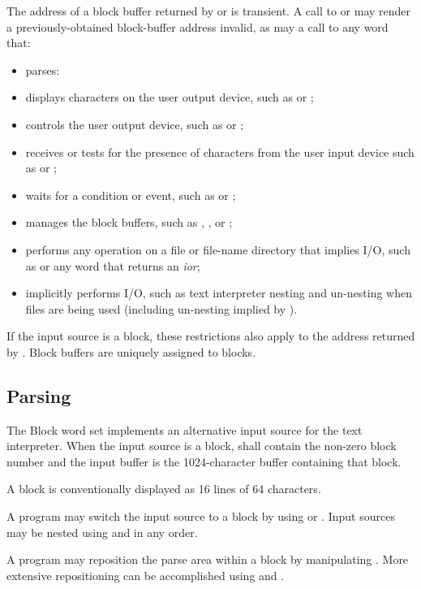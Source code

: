 The address of a block buffer returned by  or
 is transient. A call to  or 
may render a previously-obtained block-buffer address invalid, as
may a call to any word that:
\begin{itemize}
\item parses:
\item displays characters on the user output device, such as
	 or ;
\item controls the user output device, such as  or
	;
\item receives or tests for the presence of characters from the
	user input device such as  or
	;
\item waits for a condition or event, such as 
	or ;
\item manages the block buffers, such as ,
	, or ;
\item performs any operation on a file or file-name directory
	that implies I/O, such as  or any word that
	returns an \emph{ior};
\item implicitly performs I/O, such as text interpreter nesting
	and un-nesting when files are being used (including un-nesting
	implied by ).
\end{itemize}

If the input source is a block, these restrictions also apply to
the address returned by . Block buffers are
uniquely assigned to blocks.

\subsection{Parsing} %

The Block word set implements an alternative input source for the
text interpreter. When the input source is a block,  shall
contain the non-zero block number and the input buffer is the
1024-character buffer containing that block.

A block is conventionally displayed as 16 lines of 64 characters.

A program may switch the input source to a block by using
 or . Input sources may be nested using
 and  in any order.

A program may reposition the parse area within a block by
manipulating . More extensive repositioning can be
accomplished using  and
.

